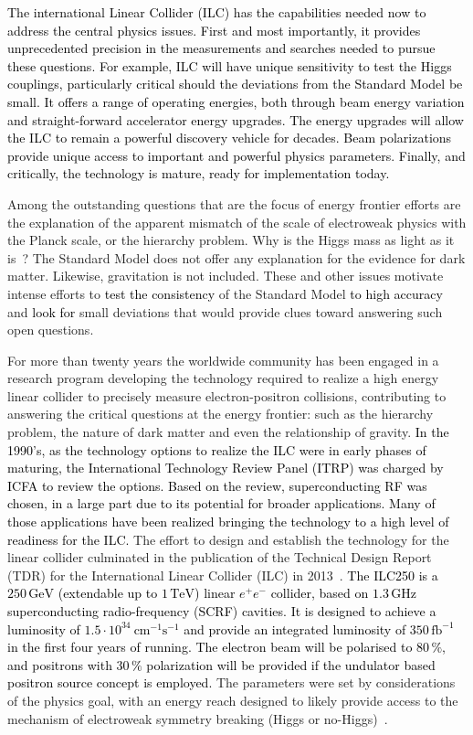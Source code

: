 \documentclass[%
 reprint,
 amsmath,amssymb,
 aps,
]{revtex4-1}
\newcommand{\juan}[1]{\textcolor{black}{{#1}}}
\newcommand{\jim}[1]{\textcolor{black}{#1}}
\begin{document}
\jim{The international Linear Collider (ILC) has the capabilities needed now to address the central physics issues. 
First and most importantly, it provides unprecedented precision 
in the measurements and searches needed to pursue these questions.  
For example, ILC will have unique sensitivity to test the 
Higgs couplings, particularly critical should the deviations 
from the Standard Model be small. It offers a range of 
operating energies, both through beam energy variation 
and straight-forward accelerator energy upgrades.  
The energy upgrades will allow the ILC to remain a powerful 
discovery vehicle for decades. Beam polarizations provide 
unique access to important and powerful physics parameters. 
Finally, and critically, the technology is mature, 
ready for implementation today.}

Among the outstanding questions that are the focus of energy frontier
efforts are the explanation of the apparent mismatch of the scale of
electroweak physics with the Planck scale, or the hierarchy problem.
Why is the Higgs mass as light as it is~?
The Standard Model does not offer any explanation for the evidence for dark matter.
Likewise, gravitation is not included.  These and other issues
motivate intense efforts to \juan{test the consistency} of the Standard Model \juan{to high accuracy}
and \juan{look for} small deviations that would provide clues toward answering such
open questions.

For more than twenty years the worldwide community has been engaged in a research
program developing the technology required to realize a high energy linear collider
to precisely measure electron-positron collisions, contributing to 
answering the critical questions at the energy frontier: such as the hierarchy problem,
the nature of dark matter and even the relationship of gravity.
\jim{In the 1990's, as the technology options to realize the ILC were in early phases of maturing, the International Technology Review Panel (ITRP) was charged by ICFA to review the options.  Based on the review, superconducting RF was chosen, in a large part due to its potential for broader applications.  Many of those applications have been realized bringing the technology to a high level of readiness for the ILC.}
The effort to design and establish the technology for the linear collider 
culminated in the publication of the Technical Design Report (TDR)
for the International Linear Collider (ILC) in 2013~\cite{Behnke:2013xla}. 
\juan{  The \jim{ILC250} is a $250\,{\mathrm{GeV}}$ (extendable up to $1\,{\mathrm{TeV}}$) linear $e^+e^-$ collider, based on $1.3\,{\mathrm{GHz}}$ superconducting radio-frequency (SCRF) cavities. It is designed to  achieve a luminosity of $1.5\cdot 10^{34}~{\mathrm{cm}}^{-1}{\mathrm{s}}^{-1}$ and provide an integrated luminosity of $350\,{\mathrm{fb}}^{-1}$ in the first four years of running. The electron beam will be polarised to $80\,\%$, and positrons with $30\,\%$ polarization will be provided if the undulator based positron source concept is employed.} The parameters were set by considerations of the physics goal,
with an energy reach designed to likely provide access to the mechanism of 
electroweak symmetry breaking (Higgs or no-Higgs)~\cite{Baer:2013cma}.
\end{document}
